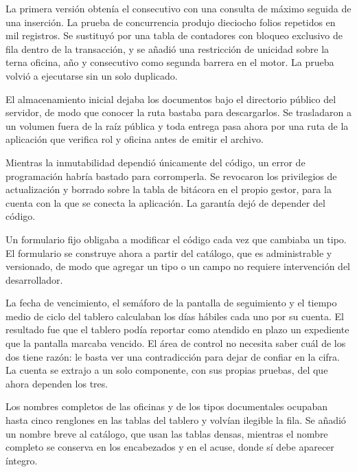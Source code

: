 \begin{description}[leftmargin=0pt,font=\bfseries,itemsep=0.5em,parsep=0pt]
  \item[Folios duplicados bajo concurrencia.] La primera versión obtenía el consecutivo con una consulta de máximo seguida de una inserción. La prueba de concurrencia produjo dieciocho folios repetidos en mil registros. Se sustituyó por una tabla de contadores con bloqueo exclusivo de fila dentro de la transacción, y se añadió una restricción de unicidad sobre la terna oficina, año y consecutivo como segunda barrera en el motor. La prueba volvió a ejecutarse sin un solo duplicado.
  \item[Archivos alcanzables por dirección directa.] El almacenamiento inicial dejaba los documentos bajo el directorio público del servidor, de modo que conocer la ruta bastaba para descargarlos. Se trasladaron a un volumen fuera de la raíz pública y toda entrega pasa ahora por una ruta de la aplicación que verifica rol y oficina antes de emitir el archivo.
  \item[La bitácora podía alterarse desde la aplicación.] Mientras la inmutabilidad dependió únicamente del código, un error de programación habría bastado para corromperla. Se revocaron los privilegios de actualización y borrado sobre la tabla de bitácora en el propio gestor, para la cuenta con la que se conecta la aplicación. La garantía dejó de depender del código.
  \item[Metadatos distintos por tipo documental.] Un formulario fijo obligaba a modificar el código cada vez que cambiaba un tipo. El formulario se construye ahora a partir del catálogo, que es administrable y versionado, de modo que agregar un tipo o un campo no requiere intervención del desarrollador.
  \item[Tres cuentas distintas del día hábil.] La fecha de vencimiento, el semáforo de la pantalla de seguimiento y el tiempo medio de ciclo del tablero calculaban los días hábiles cada uno por su cuenta. El resultado fue que el tablero podía reportar como atendido en plazo un expediente que la pantalla marcaba vencido. El área de control no necesita saber cuál de los dos tiene razón: le basta ver una contradicción para dejar de confiar en la cifra. La cuenta se extrajo a un solo componente, con sus propias pruebas, del que ahora dependen los tres.
  \item[Nombres largos en las tablas densas.] Los nombres completos de las oficinas y de los tipos documentales ocupaban hasta cinco renglones en las tablas del tablero y volvían ilegible la fila. Se añadió un nombre breve al catálogo, que usan las tablas densas, mientras el nombre completo se conserva en los encabezados y en el acuse, donde sí debe aparecer íntegro.
\end{description}


